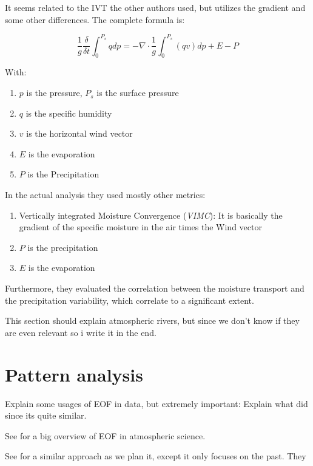 It seems related to the IVT the other authors used, but utilizes the gradient and some other differences. The complete formula is:

$$
\frac{1}{g} \frac{\delta}{\delta t} \int^{P_s}_0 q dp = - \nabla \cdot \frac{1}{g} \int^{P_s}_0 (qv) dp + E - P
$$

With: 

\begin{enumerate}
  \item $p$ is the pressure, $P_s$ is the surface pressure
  \item $q$ is the specific humidity
  \item $v$ is the horizontal wind vector
  \item $E$ is the evaporation
  \item $P$ is the Precipitation
\end{enumerate}


In the actual analysis they used mostly other metrics:


\begin{enumerate}
  \item Vertically integrated Moisture Convergence (\textit{VIMC}): It is basically the gradient of the specific moisture in the air times the Wind vector
  \item $P$ is the precipitation 
  \item $E$ is the evaporation
\end{enumerate}

Furthermore, they evaluated the correlation between the moisture transport and the precipitation variability, which correlate to a significant extent.



This section should explain atmospheric rivers, but since we don't know if they are even relevant so i write it in the end. 

\section{Pattern analysis}

Explain some usages of EOF in data, but extremely important: Explain what \cite{ayantobo_integrated_2022} did since its quite similar. 


See \cite{hannachi_empirical_2007} for a big overview of EOF in atmospheric science.

See \cite{ayantobo_integrated_2022} for a similar approach as we plan it, except it only focuses on the past.
They 
